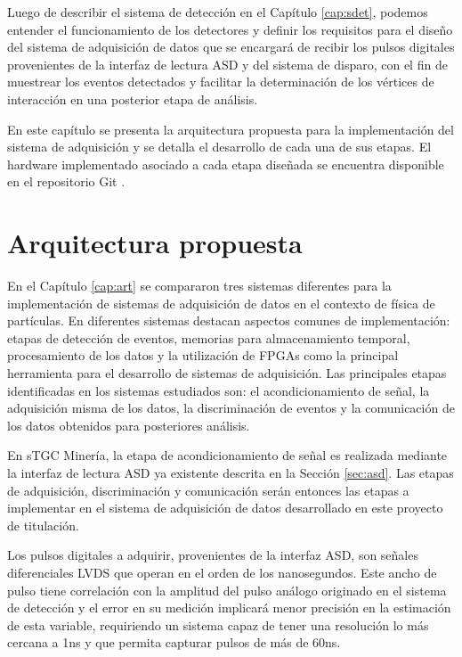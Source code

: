 Luego de describir el sistema de detección en el Capítulo \ref{cap:sdet}, podemos entender el funcionamiento de los detectores y definir los requisitos para el diseño del sistema de adquisición de datos que se encargará de recibir los pulsos digitales provenientes de la interfaz de lectura ASD y del sistema de disparo, con el fin de muestrear los eventos detectados y facilitar la determinación de los vértices de interacción en una posterior etapa de análisis.

En este capítulo se presenta la arquitectura propuesta para la implementación del sistema de adquisición y se detalla el desarrollo de cada una de sus etapas. El hardware implementado asociado a cada etapa diseñada se encuentra disponible en el repositorio Git \cite{GonzalezMuonRepository}.

\section{Arquitectura propuesta}
\label{sec:arq}

	En el Capítulo \ref{cap:art} se compararon tres sistemas diferentes para la implementación de sistemas de adquisición de datos en el contexto de física de partículas. En diferentes sistemas destacan aspectos comunes de implementación: etapas de detección de eventos, memorias para almacenamiento temporal, procesamiento de los datos y la utilización de FPGAs como la principal herramienta para el desarrollo de sistemas de adquisición. Las principales etapas identificadas en los sistemas estudiados son: el acondicionamiento de señal, la adquisición misma de los datos, la discriminación de eventos y la comunicación de los datos obtenidos para posteriores análisis.
	
	En sTGC Minería, la etapa de acondicionamiento de señal es realizada mediante la interfaz de lectura ASD ya existente descrita en la Sección \ref{sec:asd}. Las etapas de adquisición, discriminación y comunicación serán entonces las etapas a implementar en el sistema de adquisición de datos desarrollado en este proyecto de titulación.
	
	Los pulsos digitales a adquirir, provenientes de la interfaz ASD, son señales diferenciales LVDS que operan en el orden de los nanosegundos\cite{1999ATLASICs}. Este ancho de pulso tiene correlación con la amplitud del pulso análogo originado en el sistema de detección y el error en su medición implicará menor precisión en la estimación de esta variable, requiriendo un sistema capaz de tener una resolución lo más cercana a 1ns y que permita capturar pulsos de más de 60ns. 
	
